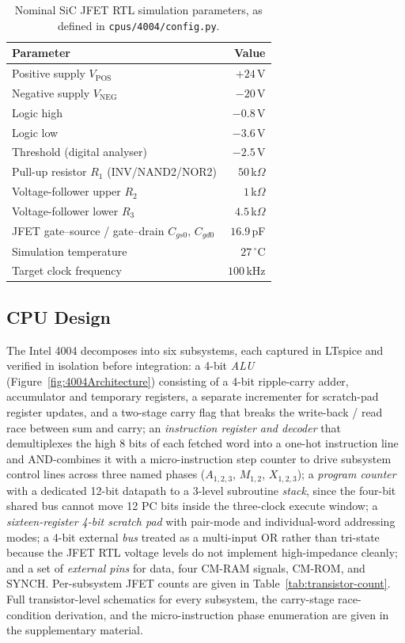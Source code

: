 \begin{table}[t]
\centering
\caption{Nominal SiC JFET RTL simulation parameters, as defined in \texttt{cpus/4004/config.py}.}
\label{tab:rtl-params}
\begin{tabular}{@{}lr@{}}
\toprule
Parameter & Value \\
\midrule
Positive supply $V_\text{POS}$ & $+24$\,V \\
Negative supply $V_\text{NEG}$ & $-20$\,V \\
Logic high & $-0.8$\,V \\
Logic low & $-3.6$\,V \\
Threshold (digital analyser) & $-2.5$\,V \\
Pull-up resistor $R_1$ (INV/NAND2/NOR2) & $50$\,k$\Omega$ \\
Voltage-follower upper $R_2$ & $1$\,k$\Omega$ \\
Voltage-follower lower $R_3$ & $4.5$\,k$\Omega$ \\
JFET gate--source / gate--drain $C_{gs0},\,C_{gd0}$ & $16.9$\,pF \\
Simulation temperature & $27$\,$^{\circ}$C \\
Target clock frequency & $100$\,kHz \\
\bottomrule
\end{tabular}
\end{table}

\subsection{CPU Design}\label{CPUDes}

\ifjxcdc
The Intel 4004 decomposes into six subsystems, each captured in LTspice and verified in isolation before integration: a 4-bit \emph{ALU} (Figure~\ref{fig:4004Architecture}) consisting of a 4-bit ripple-carry adder, accumulator and temporary registers, a separate incrementer for scratch-pad register updates, and a two-stage carry flag that breaks the write-back / read race between sum and carry; an \emph{instruction register and decoder} that demultiplexes the high 8 bits of each fetched word into a one-hot instruction line and AND-combines it with a micro-instruction step counter to drive subsystem control lines across three named phases ($A_{1,2,3}$, $M_{1,2}$, $X_{1,2,3}$); a \emph{program counter} with a dedicated 12-bit datapath to a 3-level subroutine \emph{stack}, since the four-bit shared bus cannot move 12 PC bits inside the three-clock execute window; a \emph{sixteen-register 4-bit scratch pad} with pair-mode and individual-word addressing modes; a 4-bit external \emph{bus} treated as a multi-input OR rather than tri-state because the JFET RTL voltage levels do not implement high-impedance cleanly; and a set of \emph{external pins} for data, four CM-RAM signals, CM-ROM, and SYNCH. Per-subsystem JFET counts are given in Table~\ref{tab:transistor-count}. Full transistor-level schematics for every subsystem, the carry-stage race-condition derivation, and the micro-instruction phase enumeration are given in the supplementary material.

